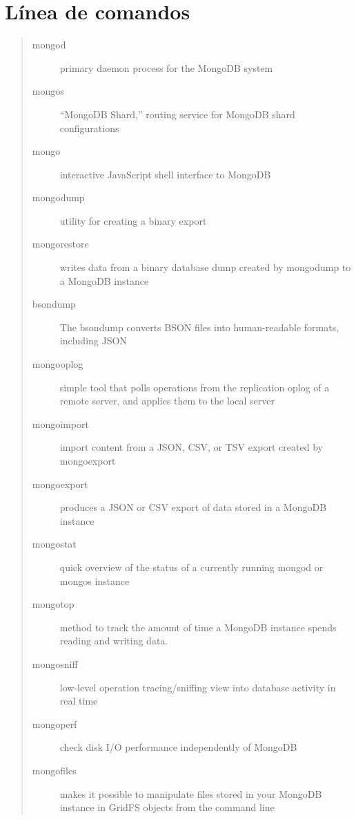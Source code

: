 \documentclass[a4paper,10pt,english]{sphinxmanual}
\begin{document}
\chapter{Línea de comandos}
\label{contents/comandos::doc}\label{contents/comandos:linea-de-comandos}\begin{quote}\begin{description}
\item[{mongod}] \leavevmode
primary daemon process for the MongoDB system

\item[{mongos}] \leavevmode
“MongoDB Shard,” routing service for MongoDB shard configurations

\item[{mongo}] \leavevmode
interactive JavaScript shell interface to MongoDB

\item[{mongodump}] \leavevmode
utility for creating a binary export

\item[{mongorestore}] \leavevmode
writes data from a binary database dump created by mongodump to a MongoDB instance

\item[{bsondump}] \leavevmode
The bsondump converts BSON files into human-readable formats, including JSON

\item[{mongooplog}] \leavevmode
simple tool that polls operations from the replication oplog of a remote server, and applies them to the local server

\item[{mongoimport}] \leavevmode
import content from a JSON, CSV, or TSV export created by mongoexport

\item[{mongoexport}] \leavevmode
produces a JSON or CSV export of data stored in a MongoDB instance

\item[{mongostat}] \leavevmode
quick overview of the status of a currently running mongod or mongos instance

\item[{mongotop}] \leavevmode
method to track the amount of time a MongoDB instance spends reading and writing data.

\item[{mongosniff}] \leavevmode
low-level operation tracing/sniffing view into database activity in real time

\item[{mongoperf}] \leavevmode
check disk I/O performance independently of MongoDB

\item[{mongofiles}] \leavevmode
makes it possible to manipulate files stored in your MongoDB instance in GridFS objects from the command line

\end{description}\end{quote}
\end{document}
